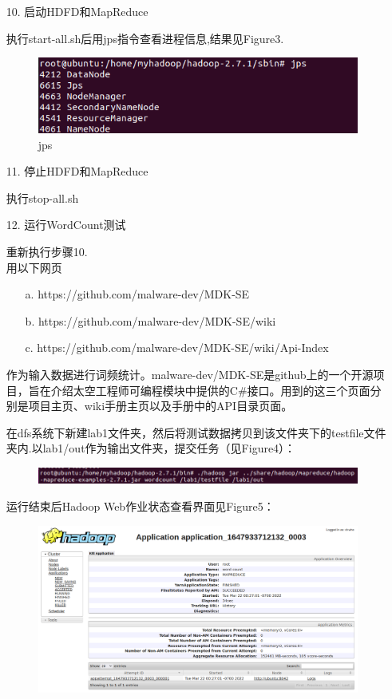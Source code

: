 \documentclass[a4paper,UTF8]{article}
\theoremstyle{definition}
\begin{document}
\begin{CJK}{UTF8}{gkai}
\begin{enumerate}
	\item[10.] 启动HDFD和MapReduce
	\par 执行start-all.sh后用jps指令查看进程信息,结果见Figure3.
	\begin{figure}[h]
    \centering
    \includegraphics{./start-all-jps.png}
    \caption{jps}
    \end{figure} 
	\item[11.] 停止HDFD和MapReduce
	\par 执行stop-all.sh
	\item[12.] 运行WordCount测试
	\par 重新执行步骤10.\\
		用以下网页
		\begin{enumerate}
		\item[a.] https://github.com/malware-dev/MDK-SE
		\item[b.] https://github.com/malware-dev/MDK-SE/wiki
		\item[c.] https://github.com/malware-dev/MDK-SE/wiki/Api-Index
		\end{enumerate}
		作为输入数据进行词频统计。malware-dev/MDK-SE是github上的一个开源项目，旨在介绍太空工程师可编程模块中提供的C\#接口。用到的这三个页面分别是项目主页、wiki手册主页以及手册中的API目录页面。
	\par 在dfs系统下新建lab1文件夹，然后将测试数据拷贝到该文件夹下的testfile文件夹内.以lab1/out作为输出文件夹，提交任务（见Figure4）：
	\begin{figure}[h]
    \centering
    \includegraphics{./submit.png}
    \caption{}
    \end{figure} 
	\par 运行结束后Hadoop Web作业状态查看界面见Figure5：
	\begin{figure}[h!]
    \centering
    \includegraphics[scale=0.35]{./application.png}

\end{figure}
\end{enumerate}
\end{CJK}
\end{document}
